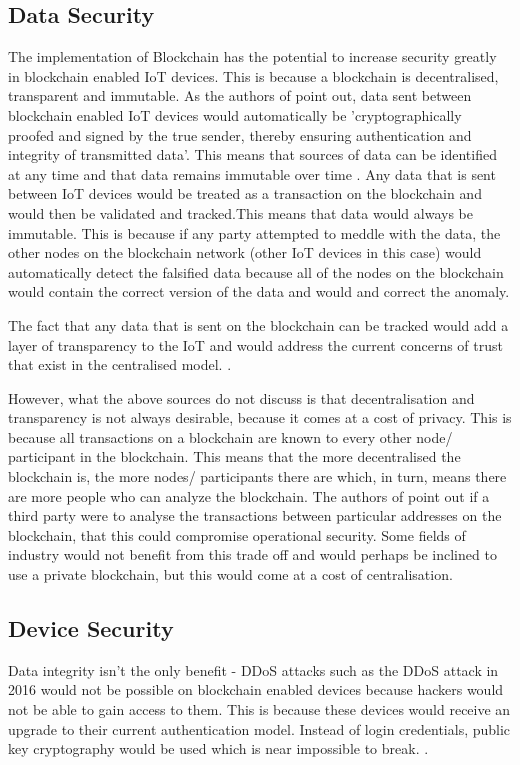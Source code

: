 \documentclass[transmag]{IEEEtran}
\begin{document}
\subsection{Data Security}
The implementation of Blockchain has the potential to increase security greatly in blockchain enabled IoT devices. This is because a blockchain is decentralised, transparent and immutable. As the authors of \cite{ref5} point out, data sent between blockchain enabled IoT devices would automatically be 'cryptographically proofed and signed by the true sender, thereby ensuring authentication and integrity of transmitted data'. This means that sources of data can be identified at any time and that data remains immutable over time \cite{ref7}. Any data that is sent between IoT devices would be treated as a transaction on the blockchain \cite{ref6} and would then be validated and tracked.This means that data would always be immutable. This is because if any party attempted to meddle with the data, the other nodes on the blockchain network (other IoT devices in this case) would automatically detect the falsified data because all of the nodes on the blockchain would contain the correct version of the data and would and correct the anomaly. 
\par The fact that any data that is sent on the blockchain can be tracked would add a layer of transparency to the IoT and would address the current concerns of trust that exist in the centralised model. \cite{ref6}. 
\par However, what the above sources do not discuss is that decentralisation and transparency is not always desirable, because it comes at a cost of privacy. This is because all transactions on a blockchain are known to every other node/ participant in the blockchain. This means that the more decentralised the blockchain is, the more nodes/ participants there are which, in turn, means there are more people who can analyze the blockchain. The authors of \cite{ref9} point out if a third party were to analyse the transactions between particular addresses on the blockchain, that this could compromise operational security.  Some fields of industry would not benefit from this trade off and would perhaps be inclined to use a private blockchain, but this would come at a cost of centralisation. 
\subsection{Device Security} Data integrity isn't the only benefit - DDoS attacks such as the DDoS attack in 2016 would not be possible on blockchain enabled devices because hackers would not be able to gain access to them. This is because these devices would receive an upgrade to their current authentication model. Instead of login credentials, public key cryptography would be used which is near impossible to break. \cite{ref11}. 
\end{document}
